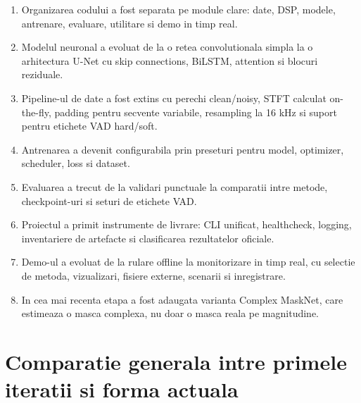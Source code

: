 \documentclass[12pt,a4paper]{article}
\begin{document}
\begin{enumerate}
    \item Organizarea codului a fost separata pe module clare: date, DSP, modele,
    antrenare, evaluare, utilitare si demo in timp real.
    \item Modelul neuronal a evoluat de la o retea convolutionala simpla la o
    arhitectura U-Net cu skip connections, BiLSTM, attention si blocuri reziduale.
    \item Pipeline-ul de date a fost extins cu perechi clean/noisy, STFT calculat
    on-the-fly, padding pentru secvente variabile, resampling la 16 kHz si suport
    pentru etichete VAD hard/soft.
    \item Antrenarea a devenit configurabila prin preseturi pentru model,
    optimizer, scheduler, loss si dataset.
    \item Evaluarea a trecut de la validari punctuale la comparatii intre metode,
    checkpoint-uri si seturi de etichete VAD.
    \item Proiectul a primit instrumente de livrare: CLI unificat, healthcheck,
    logging, inventariere de artefacte si clasificarea rezultatelor oficiale.
    \item Demo-ul a evoluat de la rulare offline la monitorizare in timp real,
    cu selectie de metoda, vizualizari, fisiere externe, scenarii si inregistrare.
    \item In cea mai recenta etapa a fost adaugata varianta Complex MaskNet, care
    estimeaza o masca complexa, nu doar o masca reala pe magnitudine.
\end{enumerate}

\section{Comparatie generala intre primele iteratii si forma actuala}
\end{document}
